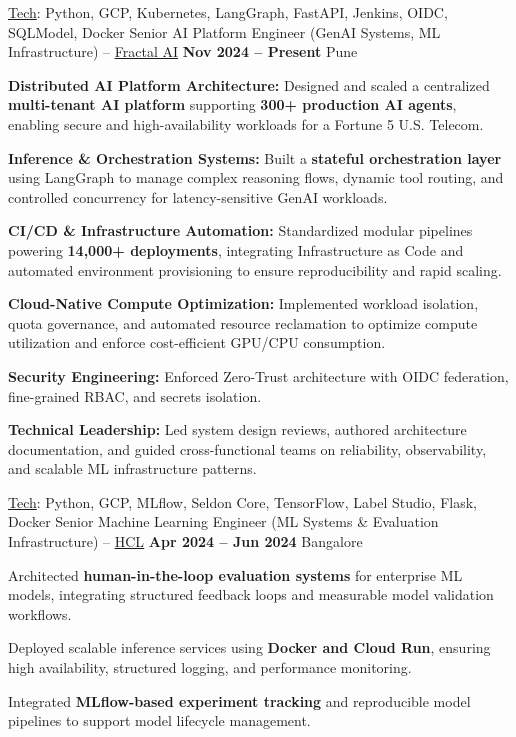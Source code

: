 \documentclass[11pt, a4paper]{awesome-cv}
\begin{document}
\begin{cventries}

\cventry
{\underline{Tech}: Python, GCP, Kubernetes, LangGraph, FastAPI, Jenkins, OIDC, SQLModel, Docker}
{Senior AI Platform Engineer (GenAI Systems, ML Infrastructure) – \underline{\href{https://fractal.ai/}{Fractal AI}}}
{\textbf{Nov 2024 – Present}}
{Pune}
{
\begin{cvitems}
  \item {\textbf{Distributed AI Platform Architecture:} Designed and scaled a centralized \textbf{multi-tenant AI platform} supporting \textbf{300+ production AI agents}, enabling secure and high-availability workloads for a Fortune 5 U.S. Telecom.}
  \item {\textbf{Inference \& Orchestration Systems:} Built a \textbf{stateful orchestration layer} using LangGraph to manage complex reasoning flows, dynamic tool routing, and controlled concurrency for latency-sensitive GenAI workloads.}
  \item {\textbf{CI/CD \& Infrastructure Automation:} Standardized modular pipelines powering \textbf{14,000+ deployments}, integrating Infrastructure as Code and automated environment provisioning to ensure reproducibility and rapid scaling.}
  \item {\textbf{Cloud-Native Compute Optimization:} Implemented workload isolation, quota governance, and automated resource reclamation to optimize compute utilization and enforce cost-efficient GPU/CPU consumption.}
  \item {\textbf{Security Engineering:} Enforced Zero-Trust architecture with OIDC federation, fine-grained RBAC, and secrets isolation.}
  \item {\textbf{Technical Leadership:} Led system design reviews, authored architecture documentation, and guided cross-functional teams on reliability, observability, and scalable ML infrastructure patterns.}
\end{cvitems}
}
\vspace{1.3em}

\cventry
{\underline{Tech}: Python, GCP, MLflow, Seldon Core, TensorFlow, Label Studio, Flask, Docker}
{Senior Machine Learning Engineer (ML Systems \& Evaluation Infrastructure) – \underline{\href{https://www.hcltech.com/}{HCL}}}
{\textbf{Apr 2024 – Jun 2024}}
{Bangalore}
{
\begin{cvitems}
  \item {Architected \textbf{human-in-the-loop evaluation systems} for enterprise ML models, integrating structured feedback loops and measurable model validation workflows.}
  \item {Deployed scalable inference services using \textbf{Docker and Cloud Run}, ensuring high availability, structured logging, and performance monitoring.}
  \item {Integrated \textbf{MLflow-based experiment tracking} and reproducible model pipelines to support model lifecycle management.}
\end{cvitems}
}
\vspace{1.3em}


\end{cventries}
\end{document}

